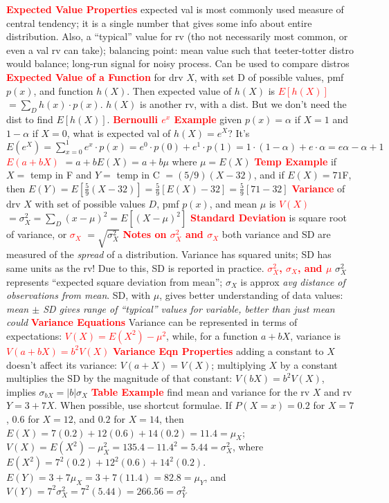\documentclass[10pt]{extarticle}
\let\oldtextbf\textbf
\renewcommand{\textbf}[1]{\textcolor{red}{\oldtextbf{#1}}}
\begin{document}
\textbf{Expected Value Properties} expected val is most commonly used measure of central tendency; it is a single number that gives some info about entire distribution. Also, a ``typical'' value for rv (tho not necessarily most common, or even a val rv can take); balancing point: mean value such that teeter-totter distro would balance; long-run signal for noisy process. Can be used to compare distros
\textbf{Expected Value of a Function} for drv $X$, with set D of possible values, pmf $p(x)$, and function $h(X)$. Then expected value of $h(X)$ is
\textbf{$E[h(X)]$} $= \sum_{D}h(x)\cdot p(x)$. $h(X)$ is another rv, with a dist. But we don't need the dist to find $E[h(X)]$.
\textbf{Bernoulli $e^{x}$ Example} given $p(x) = \alpha$ if $X=1$ and $1-\alpha$ if $X=0$, what is expected val of $h(X)=e^{X}$? It's $E(e^{X}) = \sum_{x=0}^{1}e^{x}\cdot p(x) = e^{0}\cdot p(0) + e^{1}\cdot p(1) = 1\cdot(1-\alpha)+e\cdot \alpha = e\alpha -\alpha + 1$
\textbf{$E(a+bX)$} $= a + bE(X) = a + b\mu$ where $\mu = E(X)$
\textbf{Temp Example} if $X=$ temp in F and $Y=$ temp in C $= (5/9)(X-32)$, and if $E(X)=71$F, then $E(Y)=E[\frac{5}{9}(X-32)]=\frac{5}{9}[E(X)-32]=\frac{5}{9}[71-32]$
\textbf{Variance} of drv $X$ with set of possible values $D$, pmf $p(x)$, and mean $\mu$ is 
\textbf{$V(X)$} $=\sigma_{X}^{2} = \sum_{D}(x-\mu)^{2} = E[(X-\mu)^{2}]$
\textbf{Standard Deviation} is square root of variance, or
\textbf{$\sigma_{X}$} $= \sqrt{\sigma_{X}^{2}}$ 
\textbf{Notes on $\sigma_{X}^{2}$ and $\sigma_{X}$} both variance and SD are measured of the \emph{spread} of a distribution. Variance has squared units; SD has same units as the rv! Due to this, SD is reported in practice. 
\textbf{$\sigma_{X}^{2}$, $\sigma_{X}$, and $\mu$} $\sigma_{X}^{2}$ represents ``expected square deviation from mean''; $\sigma_{X}$ is approx \emph{avg distance of observations from mean}. SD, with $\mu$, gives better understanding of data values: \emph{mean $\pm$ SD gives range of ``typical'' values for variable, better than just mean could}
\textbf{Variance Equations} Variance can be represented in terms of expectations:
\textbf{$V(X)=E(X^{2})-\mu^{2}$}, while, for a function $a+bX$, variance is
\textbf{$V(a+bX)=b^{2}V(X)$}
\textbf{Variance Eqn Properties} adding a constant to $X$ doesn't affect its variance: $V(a+X)=V(X)$; multiplying $X$ by a constant multiplies the SD by the magnitude of that constant: $V(bX)=b^{2}V(X)$, implies $\sigma_{bX}=|b|\sigma_{X}$
\textbf{Table Example} find mean and variance for the rv $X$ and rv $Y=3+7X$. When possible, use shortcut formulae. If $P(X=x)=0.2$ for $X=7$, $0.6$ for $X=12$, and $0.2$ for $X=14$, then $E(X)=7(0.2)+12(0.6)+14(0.2)=11.4=\mu_{X}$; $V(X)=E(X^{2})-\mu_{X}^{2} = 135.4-11.4^{2}=5.44=\sigma_{X}^{2}$, where $E(X^{2}) = 7^{2}(0.2)+12^{2}(0.6)+14^{2}(0.2)$. $E(Y) = 3 + 7\mu_{X} = 3 + 7(11.4) = 82.8 = \mu_{Y}$, and $V(Y) = 7^{2}\sigma_{X}^{2} = 7^{2}(5.44) = 266.56 = \sigma_{Y}^{2}$
\end{document}
